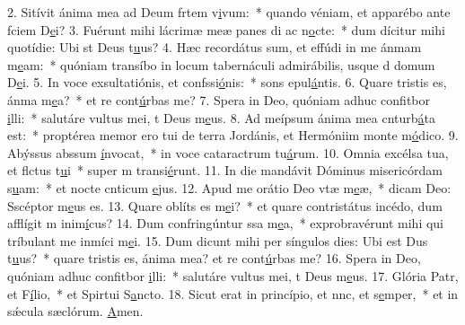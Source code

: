 2. Sitívit ánima mea ad Deum frtem v\uline{i}vum:~* quando véniam, et apparébo ante fciem D\uline{e}i?
3. Fuérunt mihi lácrimæ meæ panes di ac n\uline{o}cte:~* dum dícitur mihi quotídie: Ubi st Deus t\uline{u}us?
4. Hæc recordátus sum, et effúdi in me ánmam m\uline{e}am:~* quóniam transíbo in locum tabernáculi admirábilis, usque d domum D\uline{e}i.
5. In voce exsultatiónis, et confssi\uline{ó}nis:~* sons epul\uline{á}ntis.
6. Quare tristis es, ánma m\uline{e}a?~* et re cont\uline{ú}rbas me?
7. Spera in Deo, quóniam adhuc confitbor \uline{i}lli:~* salutáre vultus mei, t Deus m\uline{e}us.
8. Ad meípsum ánima mea cnturb\uline{á}ta est:~* proptérea memor ero tui de terra Jordánis, et Hermóniim  monte m\uline{ó}dico.
9. Abýssus abssum \uline{í}nvocat,~* in voce cataractrum tu\uline{á}rum.
10. Omnia excélsa tua, et flctus t\uline{u}i~* super m transi\uline{é}runt.
11. In die mandávit Dóminus misericórdam s\uline{u}am:~* et nocte cnticum \uline{e}jus.
12. Apud me orátio Deo vtæ m\uline{e}æ,~* dicam Deo: Sscéptor m\uline{e}us es.
13. Quare oblíts es m\uline{e}i?~* et quare contristátus incédo, dum afflígit m inim\uline{í}cus?
14. Dum confringúntur ssa m\uline{e}a,~* exprobravérunt mihi qui tríbulant me inmíci m\uline{e}i.
15. Dum dicunt mihi per síngulos dies: Ubi est Dus t\uline{u}us?~* quare tristis es, ánima mea? et re cont\uline{ú}rbas me?
16. Spera in Deo, quóniam adhuc confitbor \uline{i}lli:~* salutáre vultus mei, t Deus m\uline{e}us.
17. Glória Patr, et F\uline{í}lio,~* et Spirtui S\uline{a}ncto.
18. Sicut erat in princípio, et nnc, et s\uline{e}mper,~* et in sǽcula sæclórum. \uline{A}men.
